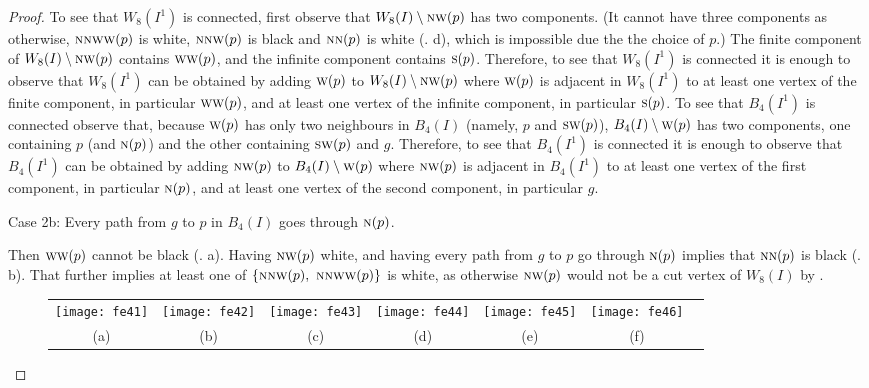 \documentclass[lotsofwhite,charterfonts]{patmorin}
\newcommand{\N}{\textsc{n}}
\renewcommand{\S}{\textsc{s}}
\newcommand{\SW}{\textsc{sw}}
\newcommand{\W}{\textsc{w}}
\newcommand{\NW}{\textsc{nw}}
\newcommand{\sm}{\ensuremath{\setminus}}
\begin{document}
\begin{proof}
To see that $W_8(I^1)$ is connected, first observe that $W_8(I)\sm \NW(p)$ has two components. (It cannot have three components as otherwise,  $\N\N\W\W(p)$ is white, $\N\N\W(p)$ is black and  $\N\N(p)$ is white (. d), which  is impossible due the the choice of $p$.) The finite component of $W_8(I)\sm \NW(p)$ contains $\W\W(p)$, and the infinite component contains $\S(p)$. Therefore, to see that $W_8(I^1)$ is connected it is enough to observe that $W_8(I^1)$ can be obtained by adding $\W(p)$ to $W_8(I)\sm \NW(p)$ where $\W(p)$ is adjacent in $W_8(I^1)$ to at least one vertex of the finite component, in particular $\W\W(p)$, and at least one vertex of the infinite component, in particular $\S(p)$. To see that $B_4(I^1)$ is connected observe that, because $\W(p)$ has only two neighbours in $B_4(I)$ (namely, $p$ and $\SW(p)$), $B_4(I)\sm \W(p)$ has two components, one containing $p$ (and $\N(p)$) and the other containing $\SW(p)$ and $g$. Therefore, to see that $B_4(I^1)$ is connected it is enough to observe that $B_4(I^1)$ can be obtained by adding $\NW(p)$ to $B_4(I)\sm \W(p)$ where $\NW(p)$ is adjacent in $B_4(I^1)$ to at least one vertex of the first component, in particular $\N(p)$, and at least one vertex of the second component, in particular $g$. 


\noindent Case 2b: Every path from $g$ to $p$ in $B_4(I)$ goes through $\N(p)$. 

Then $\W\W(p)$ cannot be black (. a). Having $\NW(p)$ white, and having every path from $g$ to $p$ go through $\N(p)$ implies that $\N\N(p)$ is black (. b). That further implies  at least one of $\{\N\NW(p),\ \N\NW\W(p)\}$ is white, as otherwise $\NW(p)$ would not be a cut vertex of $W_8(I)$ by . 

\begin{figure}[htbp]
\begin{center}
\begin{tabular}{ccccccc}
\texttt{[image: fe41]} &
\texttt{[image: fe42]} &
\texttt{[image: fe43]} &
\texttt{[image: fe44]} &
\texttt{[image: fe45]} &
\texttt{[image: fe46]}
\\
(a) & (b) & (c) & (d) & (e) & (f)
\end{tabular}
\end{center}
\caption{}
\end{figure}


\end{proof}
\end{document}

